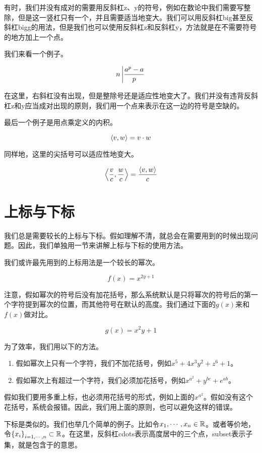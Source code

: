 有时，我们并没有成对的需要用反斜杠z、y的符号，例如在数论中我们需要写整除，但是这一竖杠只有一个，并且需要适当地变大。我们可以用反斜杠big甚至反斜杠bigg的用法，但是我们也可以使用反斜杠z和反斜杠y，方法就是在不需要符号的地方加上一个点。

我们来看一个例子。

\[  n \left| \frac{a^p-a}{p} \right.        \]

在这里，右斜杠没有出现，但是整除号还是适应性地变大了。我们并没有违背反斜杠z和y应当成对出现的原则，我们用一个点来表示在这一边的符号是空缺的。

最后一个例子是用点乘定义的内积。

\[  \left< v,w\right>=v\cdot w        \]

同样地，这里的尖括号可以适应性地变大。

\[  \left< \frac{v}{c},\frac{w}{c}\right>=\frac{\left<v,w\right>}{c}        \]


\section{上标与下标}

我们总是需要较长的上标与下标。假如理解不清，就总会在需要用到的时候出现问题。因此，我们单独用一节来讲解上标与下标的使用方法。

我们或许最先用到的上标用法是一个较长的幂次。

\[  f(x)=x^{2y+1}    \]

注意，假如幂次的符号后没有加花括号，那么系统默认是只将幂次的符号后的第一个字符提到幂次的位置，而其他符号在默认的高度。我们通过下面的$g(x)$来和$f(x)$做对比。

\[  g(x)=x^2y+1    \]

为了效率，我们用以下的方法。
\begin{enumerate}
    \item 假如幂次上只有一个字符，我们不加花括号，例如$x^5+4x^3y^2+z^6+1$。
    \item 假如幂次上有超过一个字符，我们必须加花括号，例如$x^{a^2}+y^{bc}+e^{ab}$。
\end{enumerate}

假如我们要用多重上标，也必须用花括号的形式，例如上面的$x^{a^2}$。假如没有这个花括号，系统会报错。因此，我们用上面的原则，也可以避免这样的错误。

下标是类似的。我们也举几个简单的例子。比如令$x_1,\cdots,x_n\in\mathbb{R}$。或者等价地，令$\left\{x_i\right\}_{i=1,\cdots,n}\subset \mathbb{R}$。在这里，反斜杠cdots表示高度居中的三个点，subset表示子集，就是包含于的意思。

